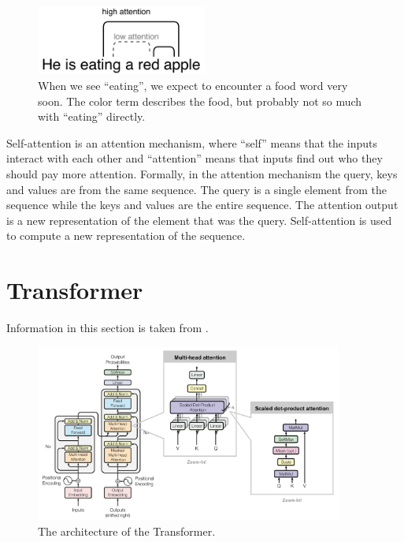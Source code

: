 \begin{figure}[hbt]
  \centering
  \includegraphics[width=0.5\textwidth]{figures/attention.pdf}
  \caption{When we see ``eating'', we expect to encounter a food word very soon. The color term describes the food, but probably not so much with ``eating'' directly.}
  \label{attention}
\end{figure}

Self-attention is an attention mechanism, where ``self'' means that the inputs interact with each other and ``attention'' means that inputs find out who they should pay more attention. Formally, in the attention mechanism the query, keys and values are from the same sequence. The query is a single element from the sequence while the keys and values are the entire sequence. The attention output is a new representation of the element that was the query. Self-attention is used to compute a new representation of the sequence.  

\section{Transformer} \label{sec_transformer}
Information in this section is taken from \cite{vaswani2017attention}.
\begin{figure}[hbt]
  \centering
  \includegraphics[width=0.9\textwidth]{figures/transformer_attention.png}
  \caption[Transformer architecture]{The architecture of the Transformer.\protect\footnotemark}
  \label{transformer}
\end{figure}

